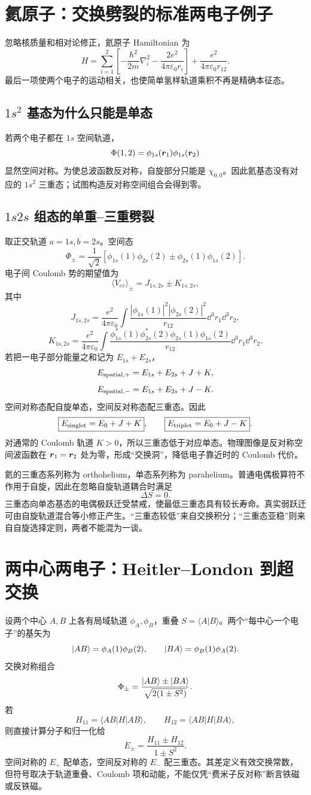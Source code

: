 \section{氦原子：交换劈裂的标准两电子例子}
忽略核质量和相对论修正，氦原子 Hamiltonian 为
\[
H=\sum_{i=1}^2\left[
-\frac{\hbar^2}{2m}\nabla_i^2
-\frac{2e^2}{4\pi\varepsilon_0r_i}
\right]
+\frac{e^2}{4\pi\varepsilon_0r_{12}}.
\]
最后一项使两个电子的运动相关，也使简单氢样轨道乘积不再是精确本征态。

\subsection{$1s^2$ 基态为什么只能是单态}
若两个电子都在 $1s$ 空间轨道，
\[
\Phi(1,2)=\phi_{1s}(\bm{r}_1)\phi_{1s}(\bm{r}_2)
\]
显然空间对称。为使总波函数反对称，自旋部分只能是
$\chi_{0,0}$。因此氦基态没有对应的 $1s^2$ 三重态；试图构造反对称空间组合会得到零。

\subsection{$1s2s$ 组态的单重--三重劈裂}
取正交轨道 $a=1s,b=2s$。空间态
\[
\Phi_\pm=\frac1{\sqrt2}
[\phi_{1s}(1)\phi_{2s}(2)
\pm\phi_{2s}(1)\phi_{1s}(2)].
\]
电子间 Coulomb 势的期望值为
\[
\langle V_{ee}\rangle_\pm=J_{1s,2s}\pm K_{1s,2s},
\]
其中
\[
J_{1s,2s}
=\frac{e^2}{4\pi\varepsilon_0}
\int\frac{|\phi_{1s}(1)|^2|\phi_{2s}(2)|^2}
{r_{12}}\dd^3r_1\dd^3r_2,
\]
\[
K_{1s,2s}
=\frac{e^2}{4\pi\varepsilon_0}
\int\frac{\phi_{1s}^*(1)\phi_{2s}^*(2)
\phi_{2s}(1)\phi_{1s}(2)}
{r_{12}}\dd^3r_1\dd^3r_2.
\]
若把一电子部分能量之和记为 $E_{1s}+E_{2s}$，
\[
E_{\rm spatial,+}=E_{1s}+E_{2s}+J+K,
\]
\[
E_{\rm spatial,-}=E_{1s}+E_{2s}+J-K.
\]
空间对称态配自旋单态，空间反对称态配三重态。因此
\[
\boxed{E_{\rm singlet}=E_0+J+K},
\qquad
\boxed{E_{\rm triplet}=E_0+J-K}.
\]
对通常的 Coulomb 轨道 $K>0$，所以三重态低于对应单态。物理图像是反对称空间波函数在
$\bm{r}_1=\bm{r}_2$ 处为零，形成“交换洞”，降低电子靠近时的 Coulomb 代价。

\begin{examplebox}[title=例 4：orthohelium 与 parahelium]
氦的三重态系列称为 orthohelium，单态系列称为 parahelium。普通电偶极算符不作用于自旋，因此在忽略自旋轨道耦合时满足
\[
\Delta S=0.
\]
三重态向单态基态的电偶极跃迁受禁戒，使最低三重态具有较长寿命。真实弱跃迁可由自旋轨道混合等小修正产生。“三重态较低”来自交换积分；“三重态亚稳”则来自自旋选择定则，两者不能混为一谈。
\end{examplebox}

\section{两中心两电子：Heitler--London 到超交换}
设两个中心 $A,B$ 上各有局域轨道 $\phi_A,\phi_B$，重叠
$S=\langle A|B\rangle$。两个“每中心一个电子”的基矢为
\[
\left|AB\right\rangle=\phi_A(1)\phi_B(2),\qquad
\left|BA\right\rangle=\phi_B(1)\phi_A(2).
\]
交换对称组合
\[
\Phi_\pm=\frac{\left|AB\right\rangle\pm\left|BA\right\rangle}
{\sqrt{2(1\pm S^2)}}.
\]
若
\[
H_{11}=\langle AB|H|AB\rangle,\qquad
H_{12}=\langle AB|H|BA\rangle,
\]
则直接计算分子和归一化给
\[
\boxed{
E_\pm=\frac{H_{11}\pm H_{12}}{1\pm S^2}}.
\]
空间对称的 $E_+$ 配单态，空间反对称的 $E_-$ 配三重态。其差定义有效交换常数，但符号取决于轨道重叠、Coulomb 项和动能，不能仅凭“费米子反对称”断言铁磁或反铁磁。

